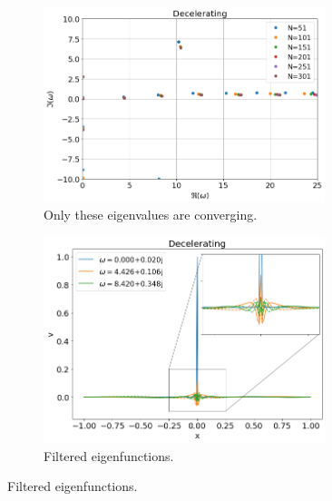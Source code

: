 \documentclass{article}
\begin{document}
\begin{figure}[H]
\begin{subfigure}[b]{0.5\textwidth}
            \includegraphics*[width=0.9\textwidth]{img/eigvals-decelerating-filtered.png}
            \caption{Only these eigenvalues are converging.}
        \end{subfigure}%
        \begin{subfigure}[b]{0.5\textwidth}
            \includegraphics*[width=0.9\textwidth]{img/eigfuncs-decelerating-filtered.png}
            \caption{Filtered eigenfunctions.}
        \end{subfigure}
    \end{figure}
\end{document}
